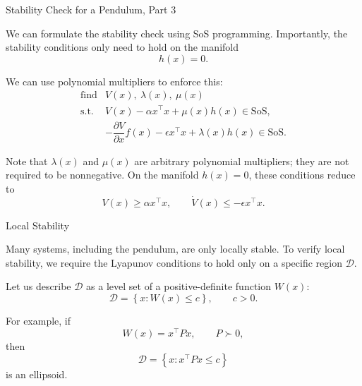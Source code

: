 \documentclass{beamer}
\begin{document}
\begin{frame}{Stability Check for a Pendulum, Part 3}
	\begin{flushleft}
		We can formulate the stability check using SoS programming. Importantly, the stability conditions only need to hold on the manifold
		\[
		h(x)=0.
		\]
		
		
		We can use polynomial multipliers to enforce this:
		\[
		\begin{array}{ll}
			\text{find} & V(x),\ \lambda(x),\ \mu(x)\\[0.2em]
			\text{s.t.}
			&
			V(x)-\alpha x^\top x+\mu(x)h(x)
			\in\mathrm{SoS},
			\\[0.4em]
			&
			-\dfrac{\partial V}{\partial x}f(x)
			-\epsilon x^\top x+\lambda(x)h(x)
			\in\mathrm{SoS}.
		\end{array}
		\]
		
		\bigskip
		
		Note that $\lambda(x)$ and $\mu(x)$ are arbitrary polynomial multipliers;
		they are not required to be nonnegative. On the manifold $h(x)=0$, these conditions reduce to
		\[
		V(x)\geq\alpha x^\top x,
		\qquad
		\dot V(x)\leq-\epsilon x^\top x.
		\]
		

	\end{flushleft}
\end{frame}


\begin{frame}{Local Stability}
	\begin{flushleft}
		Many systems, including the pendulum, are only locally stable. To verify local stability, we require the Lyapunov conditions to hold only on a specific region $\mathcal{D}$.
		
		\bigskip
		
		Let us describe $\mathcal{D}$ as a level set of a
		positive-definite function $W(x)$:
		\[
		\mathcal{D}
		=
		\left\{
		x: W(x)\leq c
		\right\},
		\qquad c>0.
		\]
		
		\bigskip
		
		For example, if
		\[
		W(x)=x^\top Px,
		\qquad P\succ0,
		\]
		then
		\[
		\mathcal{D}
		=
		\left\{
		x:x^\top Px\leq c
		\right\}
		\]
		is an ellipsoid.
	\end{flushleft}
\end{frame}
\end{document}
